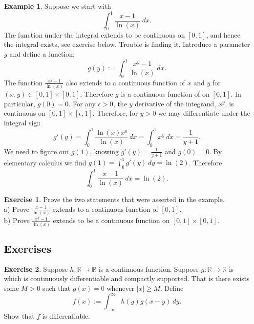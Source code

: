 \documentclass[12pt]{book}
\newcommand{\abs}[1]{\left\lvert {#1} \right\rvert}
\newcommand{\R}{{\mathbb{R}}}
\theoremstyle{plain}
\theoremstyle{remark}
\theoremstyle{definition}
\theoremstyle{exercise}
\newtheorem{exercise}{Exercise}[section]
\theoremstyle{example}
\newtheorem{example}[thm]{Example}
\begin{document}
\begin{example}
Suppose we start with
\begin{equation*}
\int_0^{1} \frac{x-1}{\ln(x)} ~dx .
\end{equation*}
The function under the integral 
extends to be continuous on $[0,1]$, and hence
the integral exists, see exercise below.  Trouble is finding it.  Introduce a parameter $y$
and define a function:
\begin{equation*}
g(y) := \int_0^{1} \frac{x^y-1}{\ln(x)} ~dx .
\end{equation*}
The function
$\frac{x^y-1}{\ln(x)}$
also extends to a continuous function of $x$ and $y$
for $(x,y) \in [0,1] \times [0,1]$.
Therefore
$g$ is a continuous function of on $[0,1]$.  In particular, $g(0) = 0$.
For any $\epsilon > 0$, the $y$ derivative of the integrand, $x^y$,
is continuous on $[0,1] \times [\epsilon,1]$.  Therefore,
for $y >0$ we may differentiate under the integral sign
\begin{equation*}
g'(y) =
\int_0^{1} \frac{\ln(x) x^y}{\ln(x)} ~dx 
=
\int_0^{1} x^y ~dx =
\frac{1}{y+1} .
\end{equation*}
We need to figure out $g(1)$, knowing $g'(y) = \frac{1}{y+1}$ and $g(0) =
0$.  By elementary calculus we find $g(1) = \int_0^1 g'(y)~dy = \ln(2)$.  Therefore
\begin{equation*}
\int_0^{1} \frac{x-1}{\ln(x)} ~dx  = \ln(2).
\end{equation*}
\end{example}

\begin{exercise}
Prove the two statements that were asserted in the example.\\
a) Prove $\frac{x-1}{\ln(x)}$ extends to a continuous function of
$[0,1]$.\\
b) Prove $\frac{x^y-1}{\ln(x)}$ extends to be a continuous function
on $[0,1] \times [0,1]$.
\end{exercise}

\subsection{Exercises}

\begin{exercise}
Suppose $h \colon \R \to \R$ is a continuous function.  Suppose $g
\colon \R \to \R$ is which is continuously differentiable and compactly
supported.  That is there exists some $M > 0$ such that $g(x) = 0$ whenever
$\abs{x} \geq M$.  Define
\begin{equation*}
f(x) := \int_{-\infty}^\infty h(y)g(x-y)~dy  .
\end{equation*}
Show that $f$ is differentiable.
\end{exercise}
\end{document}
